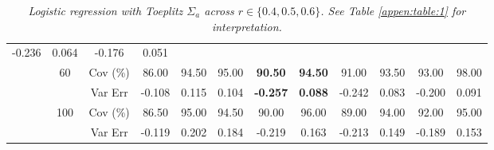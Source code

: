 \begin{table}[!h]
{\begin{tabular}{|c|c|c|c|cccccccc|}
-0.236 &
\multicolumn{1}{c|}{0.064} &
-0.176 &
0.051 \\ \cline{2-12} 
&
\multirow{2}{*}{60} &
Cov (\%) &
86.00 &
94.50 &
\multicolumn{1}{c|}{95.00} &
\textbf{90.50} &
\multicolumn{1}{c|}{\textbf{94.50}} &
91.00 &
\multicolumn{1}{c|}{93.50} &
93.00 &
98.00 \\
&
&
Var Err &
-0.108 &
0.115 &
\multicolumn{1}{c|}{0.104} &
\textbf{-0.257} &
\multicolumn{1}{c|}{\textbf{0.088}} &
-0.242 &
\multicolumn{1}{c|}{0.083} &
-0.200 &
0.091 \\ \cline{2-12} 
&
\multirow{2}{*}{100} &
Cov (\%) &
86.50 &
95.00 &
\multicolumn{1}{c|}{94.50} &
90.00 &
\multicolumn{1}{c|}{96.00} &
89.00 &
\multicolumn{1}{c|}{94.00} &
92.00 &
95.00 \\
&
&
Var Err &
-0.119 &
0.202 &
\multicolumn{1}{c|}{0.184} &
-0.219 &
\multicolumn{1}{c|}{0.163} &
-0.213 &
\multicolumn{1}{c|}{0.149} &
-0.189 &
0.153 \\ \hline		
\end{tabular}}
\caption{\textit{Logistic regression with Toeplitz $\Sigma_a$ across $r\in\{0.4, 0.5, 0.6\}$. See Table \ref{appen:table:1} for interpretation.}}
\label{appen:table:3}
\end{table}




